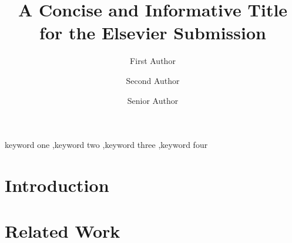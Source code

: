\documentclass[3p,times]{elsarticle}
\begin{document}
\begin{frontmatter}

\title{A Concise and Informative Title for the Elsevier Submission}

\author[a]{First Author}

\author[b]{Second Author}

\author[a]{Senior Author}

\address[a]{Department of X, University of Y, City, Country}
\address[b]{Department of Z, Institute of W, City, Country}

\begin{abstract}
\end{abstract}

\begin{keyword}
keyword one \sep keyword two \sep keyword three \sep keyword four
\end{keyword}

\end{frontmatter}

\section{Introduction}
\label{sec:intro}

\section{Related Work}
\label{sec:related}

\end{document}
